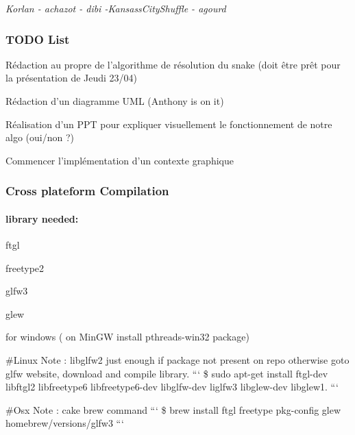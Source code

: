 {\itshape Korlan -\/ achazot -\/ dibi -\/\-Kansass\-City\-Shuffle -\/ agourd}

\subsubsection*{T\-O\-D\-O List}


\begin{DoxyEnumerate}
\item Rédaction au propre de l'algorithme de résolution du snake (doit être prêt pour la présentation de Jeudi 23/04)
\item Rédaction d'un diagramme U\-M\-L (Anthony is on it)
\item Réalisation d'un P\-P\-T pour expliquer visuellement le fonctionnement de notre algo (oui/non ?)
\item Commencer l'implémentation d'un contexte graphique
\end{DoxyEnumerate}

\subsubsection*{Cross plateform Compilation}

\paragraph*{library needed\-:}


\begin{DoxyItemize}
\item ftgl
\item freetype2
\item glfw3
\item glew
\item for windows ( on Min\-G\-W install pthreads-\/win32 package)
\end{DoxyItemize}

\#\-Linux Note \-: libglfw2 just enough if package not present on repo otherwise goto glfw website, download and compile library. ``` \$ sudo apt-\/get install ftgl-\/dev libftgl2 libfreetype6 libfreetype6-\/dev libglfw-\/dev liglfw3 libglew-\/dev libglew1. ```

\#\-Osx Note \-: cake brew command ``` \$ brew install ftgl freetype pkg-\/config glew homebrew/versions/glfw3 ``` 